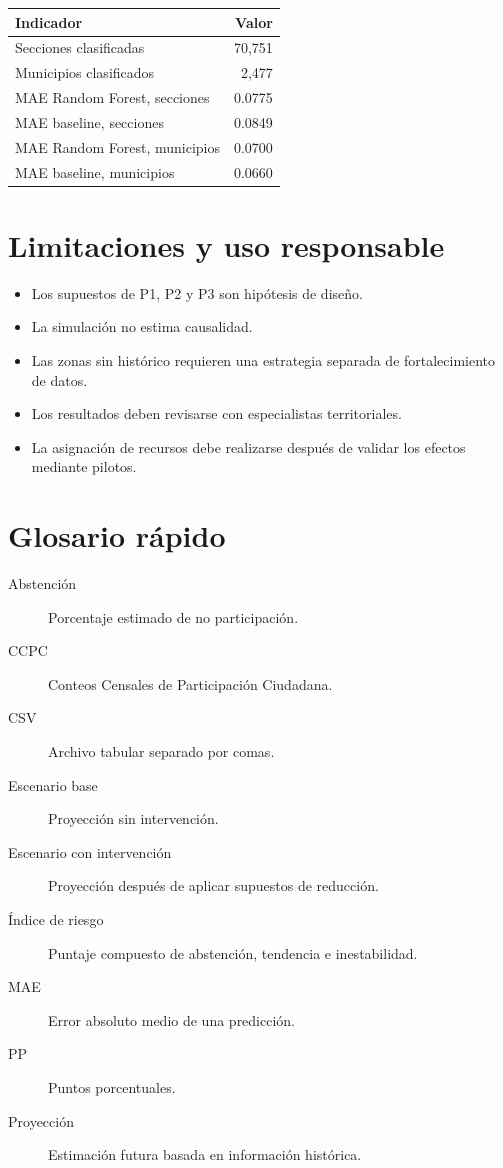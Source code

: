 \documentclass[11pt,a4paper]{article}
\begin{document}
\begin{longtable}{p{}r}
\toprule
\textbf{Indicador} & \textbf{Valor}\\
\midrule
Secciones clasificadas & 70,751\\
Municipios clasificados & 2,477\\
MAE Random Forest, secciones & 0.0775\\
MAE baseline, secciones & 0.0849\\
MAE Random Forest, municipios & 0.0700\\
MAE baseline, municipios & 0.0660\\
\bottomrule
\end{longtable}

\section{Limitaciones y uso responsable}

\begin{itemize}
    \item Los supuestos de P1, P2 y P3 son hipótesis de diseño.
    \item La simulación no estima causalidad.
    \item Las zonas sin histórico requieren una estrategia separada de fortalecimiento de datos.
    \item Los resultados deben revisarse con especialistas territoriales.
    \item La asignación de recursos debe realizarse después de validar los efectos mediante pilotos.
\end{itemize}

\section{Glosario rápido}

\begin{description}
    \item[Abstención] Porcentaje estimado de no participación.
    \item[CCPC] Conteos Censales de Participación Ciudadana.
    \item[CSV] Archivo tabular separado por comas.
    \item[Escenario base] Proyección sin intervención.
    \item[Escenario con intervención] Proyección después de aplicar supuestos de reducción.
    \item[Índice de riesgo] Puntaje compuesto de abstención, tendencia e inestabilidad.
    \item[MAE] Error absoluto medio de una predicción.
    \item[PP] Puntos porcentuales.
    \item[Proyección] Estimación futura basada en información histórica.
\end{description}
\end{document}
